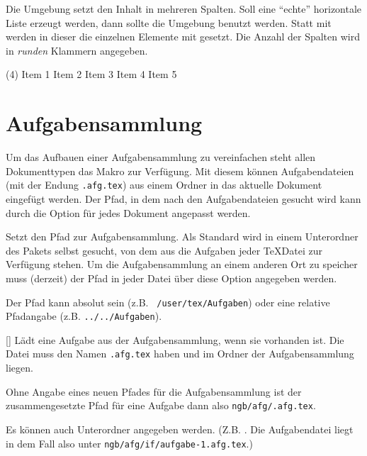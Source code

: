 Die Umgebung  setzt den Inhalt in mehreren Spalten. Soll eine \enquote{echte} horizontale Liste erzeugt werden, dann sollte die Umgebung  benutzt werden. Statt mit  werden in dieser die einzelnen Elemente mit  gesetzt. Die Anzahl der Spalten wird in \emph{runden} Klammern angegeben. 

\begin{example}
	\begin{tasks}(4)
		\task Item 1
		\task Item 2
		\task Item 3
		\task Item 4
		\task Item 5
	\end{tasks}
\end{example}

\section{Aufgabensammlung}\label{sec:aufgabensammlung}
Um das Aufbauen einer Aufgabensammlung zu vereinfachen steht allen Dokumenttypen das Makro  zur Verfügung. Mit diesem können Aufgabendateien (mit der Endung \texttt{.afg.tex}) aus einem Ordner in das aktuelle Dokument eingefügt werden. Der Pfad, in dem nach den Aufgabendateien gesucht wird kann durch die Option  für jedes Dokument angepasst werden.

\begin{options}
	Setzt den Pfad zur Aufgabensammlung. Als Standard wird in einem Unterordner des Pakets selbst gesucht, von dem aus die Aufgaben jeder \TeX Datei zur Verfügung stehen. Um die Aufgabensammlung an einem anderen Ort zu speicher muss (derzeit) der Pfad in jeder Datei über diese Option angegeben werden.
	
	Der Pfad kann absolut sein (z.B. \texttt{~/user/tex/Aufgaben}) oder eine relative Pfadangabe (z.B. \texttt{../../Aufgaben}).
\end{options}

\begin{commands}
	[]
	Lädt eine Aufgabe aus der Aufgabensammlung, wenn sie vorhanden ist. Die Datei muss den Namen \texttt{.afg.tex} haben und im Ordner der Aufgabensammlung liegen.
	
	Ohne Angabe eines neuen Pfades für die Aufgabensammlung
	ist der zusammengesetzte Pfad für eine Aufgabe dann also
	\texttt{ngb/afg/.afg.tex}.
	
	Es können auch Unterordner angegeben werden. (Z.B. . Die
	Aufgabendatei liegt in dem Fall also unter \texttt{ngb/afg/if/aufgabe-1.afg.tex}.)
\end{commands}


